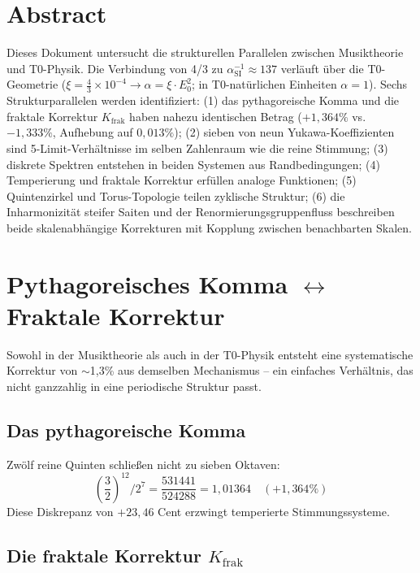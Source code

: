 \section*{Abstract}
Dieses Dokument untersucht die strukturellen Parallelen zwischen Musiktheorie und T0-Physik. Die Verbindung von 4/3 zu $\alpha_\text{SI}^{-1} \approx 137$ verläuft über die T0-Geometrie ($\xi = \frac{4}{3} \times 10^{-4} \to \alpha = \xi \cdot E_0^2$; in T0-natürlichen Einheiten $\alpha = 1$). Sechs Strukturparallelen werden identifiziert: (1) das pythagoreische Komma und die fraktale Korrektur $K_\text{frak}$ haben nahezu identischen Betrag ($+1{,}364\%$ vs.\ $-1{,}333\%$, Aufhebung auf $0{,}013\%$); (2) sieben von neun Yukawa-Koeffizienten sind 5-Limit-Verhältnisse im selben Zahlenraum wie die reine Stimmung; (3) diskrete Spektren entstehen in beiden Systemen aus Randbedingungen; (4) Temperierung und fraktale Korrektur erfüllen analoge Funktionen; (5) Quintenzirkel und Torus-Topologie teilen zyklische Struktur; (6) die Inharmonizität steifer Saiten und der Renormierungsgruppenfluss beschreiben beide skalenabhängige Korrekturen mit Kopplung zwischen benachbarten Skalen.

\section{\texorpdfstring{Pythagoreisches Komma $\leftrightarrow$ Fraktale Korrektur}{Pythagoreisches Komma -- Fraktale Korrektur}}

Sowohl in der Musiktheorie als auch in der T0-Physik entsteht eine systematische Korrektur von $\sim$1{,}3\% aus demselben Mechanismus -- ein einfaches Verhältnis, das nicht ganzzahlig in eine periodische Struktur passt.

\subsection{Das pythagoreische Komma}

Zwölf reine Quinten schließen nicht zu sieben Oktaven:
\begin{equation}
	\left(\frac{3}{2}\right)^{12} \Big/ 2^7 = \frac{531441}{524288} = 1{,}01364 \quad (+1{,}364\%)
\end{equation}
Diese Diskrepanz von $+23{,}46$ Cent erzwingt temperierte Stimmungssysteme.

\subsection{Die fraktale Korrektur $K_\text{frak}$}

